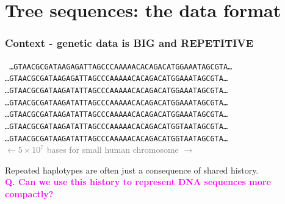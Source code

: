 \documentclass[11pt, mathserif, aspectratio=169]{beamer}
\newcommand{\magenta}[1]{\textcolor{magenta}{#1}}
\newcommand{\gray}[1]{\textcolor{gray}{#1}}
\newenvironment{wideitemize}{\itemize\addtolength{\itemsep}{10pt}}{\enditemize}
\begin{document}
%
%


\section{Tree sequences: the data format}

\begin{frame}
\frametitle{Context - genetic data is BIG and REPETITIVE}
 \begin{center}
{\tt
\ldots GTAACGCGATAAGAGATTAGCCCAAAAACACAGACATGGAAATAGCGTA\ldots \\
\ldots GTAACGCGATAAGAGATTAGCCCAAAAACACAGACATGGAAATAGCGTA\ldots \\
\ldots GTAACGCGATAAGATATTAGCCCAAAAACACAGACATGGAAATAGCGTA\ldots \\
\ldots GTAACGCGATAAGATATTAGCCCAAAAACACAGACATGGAAATAGCGTA\ldots \\
\ldots GTAACGCGATAAGATATTAGCCCAAAAACACAGACATGGAAATAGCGTA\ldots \\
\ldots GTAACGCGATAAGATATTAGCCCAAAAACACAGACATGGTAATAGCGTA\ldots \\
\ldots GTAACGCGATAAGATATTAGCCCAAAAACACAGACATGGTAATAGCGTA\ldots \\[3mm]
}
\gray{$\leftarrow 5\times 10^7$ bases for small human chromosome $\rightarrow$}
\end{center}
Repeated haplotypes are often just a consequence of shared history.\\[3mm]
\magenta{\bf Q. Can we use this history to represent DNA sequences more compactly?}
\end{frame}
\end{document}
